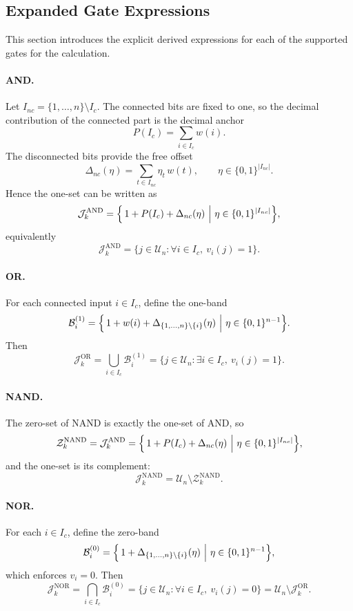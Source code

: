 \documentclass[11pt]{article}
\theoremstyle{definition}
\newcommand{\U}{\mathcal{U}_n}
\newcommand{\Ic}{I_c}
\newcommand{\J}{\mathcal{J}}
\newcommand{\bits}{\{0,1\}}
\begin{document}
\subsection{Expanded Gate Expressions}
This section introduces the explicit derived expressions 
for each of the supported gates for the calculation.

\paragraph{AND.}
Let \(I_{nc}=\{1,\dots,n\}\setminus \Ic\). The connected bits are fixed to one, so the decimal contribution of the connected part is the decimal anchor
\[
P(\Ic)=\sum_{i\in\Ic} w(i).
\]
The disconnected bits provide the free offset
\[
\Delta_{nc}(\eta)=\sum_{t\in I_{nc}} \eta_t\,w(t), \qquad \eta\in\bits^{|I_{nc}|}.
\]
Hence the one-set can be written as
\[
\J_k^{\mathrm{AND}}
=
\Bigl\{\,1+P(\Ic)+\Delta_{nc}(\eta)\ \Big|\ \eta\in\bits^{|I_{nc}|}\Bigr\},
\]
equivalently
\[
\J_k^{\mathrm{AND}}=\{j\in\U:\forall i\in\Ic,\ v_i(j)=1\}.
\]

\paragraph{OR.}
For each connected input \(i\in\Ic\), define the one-band
\[
\mathcal{B}_i^{(1)}
=
\Bigl\{\,1+w(i)+\Delta_{\{1,\dots,n\}\setminus\{i\}}(\eta)\ \Big|\
\eta\in\bits^{n-1}\Bigr\}.
\]
Then
\[
\J_k^{\mathrm{OR}}=\bigcup_{i\in\Ic}\mathcal{B}_i^{(1)}
=
\{j\in\U:\exists i\in\Ic,\ v_i(j)=1\}.
\]

\paragraph{NAND.}
The zero-set of NAND is exactly the one-set of AND, so
\[
\mathcal{Z}_k^{\mathrm{NAND}}
=
\J_k^{\mathrm{AND}}
=
\Bigl\{\,1+P(\Ic)+\Delta_{nc}(\eta)\ \Big|\ \eta\in\bits^{|I_{nc}|}\Bigr\},
\]
and the one-set is its complement:
\[
\J_k^{\mathrm{NAND}}=\U\setminus \mathcal{Z}_k^{\mathrm{NAND}}.
\]

\paragraph{NOR.}
For each \(i\in\Ic\), define the zero-band
\[
\mathcal{B}_i^{(0)}
=
\Bigl\{\,1+\Delta_{\{1,\dots,n\}\setminus\{i\}}(\eta)\ \Big|\
\eta\in\bits^{n-1}\Bigr\},
\]
which enforces \(v_i=0\). Then
\[
\J_k^{\mathrm{NOR}}=\bigcap_{i\in\Ic}\mathcal{B}_i^{(0)}
=
\{j\in\U:\forall i\in\Ic,\ v_i(j)=0\}
=
\U\setminus\J_k^{\mathrm{OR}}.
\]
\end{document}
